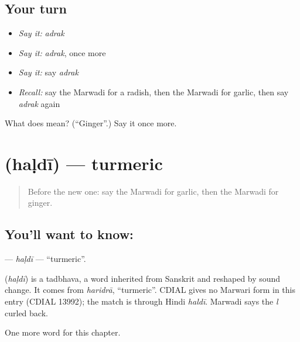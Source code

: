 \subsection*{Your turn}
\begin{itemize}
\raggedright
  \item \emph{Say it:} \emph{adrak}
  \item \emph{Say it:} \emph{adrak}, once more
  \item \emph{Say it:} say \emph{adrak}
  \item \emph{Recall:} say the Marwadi for a radish, then the Marwadi for garlic, then say \emph{adrak} again
\end{itemize}

\begin{tcolorbox}[breakable,colback=teal!4,colframe=teal!35!black,title={Before you move on}]
What does  mean? (\textquotedblleft{}Ginger\textquotedblright{}.) Say it once more.
\end{tcolorbox}
\section[\texorpdfstring{\mw{हळदी} (haḷdī)}{हळदी (haḷdī)}]{ (haḷdī) — turmeric}

\label{lesson:MW-C136-haldi}



\begin{quote}
Before the new one: say the Marwadi for garlic, then the Marwadi for ginger.
\end{quote}

\subsection*{You'll want to know: }
\textbf{} — \emph{haḷdī} — \textquotedblleft{}turmeric\textquotedblright{}.

\begin{cousinweb}
\textbf{} (\emph{haḷdī}) is a tadbhava, a word inherited from Sanskrit and reshaped by sound change. It comes from \emph{haridrā}, \textquotedblleft{}turmeric\textquotedblright{}. CDIAL gives no Marwari form in this entry (CDIAL 13992); the match is through Hindi \emph{haldī}. Marwadi says the \emph{l} curled back.
\end{cousinweb}

\begin{grammarlens}[title={What you've built}]
One more word for this chapter.
\end{grammarlens}

